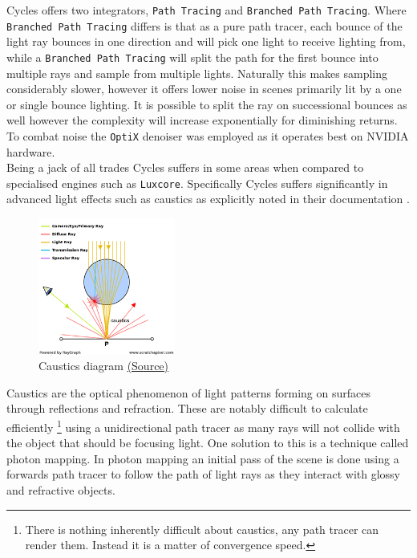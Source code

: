 \documentclass[11pt]{article}
\begin{document}
Cycles offers two integrators, \texttt{Path Tracing} and \texttt{Branched Path Tracing}. Where
\texttt{Branched Path Tracing}  differs is that as a pure path tracer, each bounce of the
light ray bounces in one direction and will pick one light to receive lighting
from, while a \texttt{Branched Path Tracing} will split the path for the first bounce
into multiple rays and sample from multiple lights. Naturally this makes
sampling considerably slower, however it offers lower noise in scenes primarily
lit by a one or single bounce lighting. It is possible to split the ray on
successional bounces as well however the complexity will increase exponentially
for diminishing returns.\\

To combat noise the \texttt{OptiX} denoiser was employed as it operates best on NVIDIA
hardware.\\

Being a jack of all trades Cycles suffers in some areas when compared to
specialised engines such as \texttt{Luxcore}. Specifically Cycles suffers significantly
in advanced light effects such as caustics as explicitly noted in their
documentation \cite{blender-sampling}.\\

\begin{figure}[htbp]
\centering
\includegraphics[width=0.4\textwidth]{Images/caustics2.png}
\caption{\label{caustics}Caustics diagram \href{https://www.scratchapixel.com/lessons/3d-basic-rendering/global-illumination-path-tracing}{(Source)}}
\end{figure}
Caustics are the optical phenomenon of light patterns forming on surfaces
through reflections and refraction. These are notably difficult to calculate
efficiently \footnote{There is nothing inherently difficult about caustics, any path tracer can
render them. Instead it is a matter of convergence speed.} using a unidirectional path tracer as many rays will not
collide with the object that should be focusing light. One solution to this is a
technique called photon mapping. In photon mapping an initial pass of the scene
is done using a forwards path tracer to follow the path of light rays as they
interact with glossy and refractive objects.\\
\end{document}
